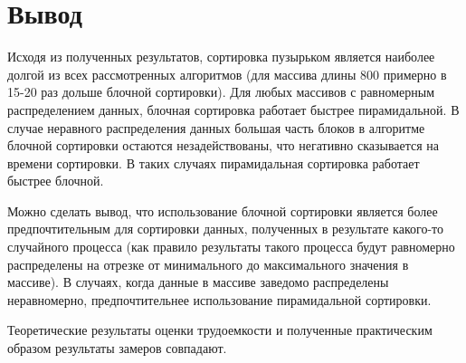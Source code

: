 \section*{Вывод}
Исходя из полученных результатов, сортировка пузырьком является наиболее долгой из всех рассмотренных алгоритмов (для массива длины 800 примерно в 15-20 раз дольше блочной сортировки). Для любых массивов с равномерным распределением данных, блочная сортировка работает быстрее пирамидальной. В случае неравного распределения данных большая часть блоков в алгоритме блочной сортировки остаются незадействованы, что негативно сказывается на времени сортировки. В таких случаях пирамидальная сортировка работает быстрее блочной.

Можно сделать вывод, что использование блочной сортировки является более предпочтительным для сортировки данных, полученных в результате какого-то случайного процесса (как правило результаты такого процесса будут равномерно распределены на отрезке от минимального до максимального значения в массиве). В случаях, когда данные в массиве заведомо распределены неравномерно, предпочтительнее использование пирамидальной сортировки.

Теоретические результаты оценки трудоемкости и полученные практическим образом результаты замеров совпадают.



